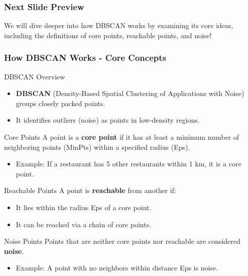 \documentclass[aspectratio=169]{beamer}
\begin{document}
\begin{frame}[fragile]
    \frametitle{Next Slide Preview}
    We will dive deeper into how DBSCAN works by examining its core ideas, including the definitions of core points, reachable points, and noise!
\end{frame}

\begin{frame}[fragile]
    \frametitle{How DBSCAN Works - Core Concepts}
    \begin{block}{DBSCAN Overview}
        \begin{itemize}
            \item \textbf{DBSCAN} (Density-Based Spatial Clustering of Applications with Noise) groups closely packed points.
            \item It identifies outliers (noise) as points in low-density regions.
        \end{itemize}
    \end{block}
    
    \begin{block}{Core Points}
        A point is a \textbf{core point} if it has at least a minimum number of neighboring points (MinPts) within a specified radius (Eps).
        \begin{itemize}
            \item Example: If a restaurant has 5 other restaurants within 1 km, it is a core point.
        \end{itemize}
    \end{block}
    
    \begin{block}{Reachable Points}
        A point is \textbf{reachable} from another if:
        \begin{itemize}
            \item It lies within the radius Eps of a core point.
            \item It can be reached via a chain of core points.
        \end{itemize}
    \end{block}
    
    \begin{block}{Noise Points}
        Points that are neither core points nor reachable are considered \textbf{noise}.
        \begin{itemize}
            \item Example: A point with no neighbors within distance Eps is noise.
        \end{itemize}
    \end{block}
\end{frame}
\end{document}
